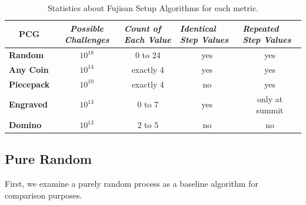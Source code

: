 \documentclass[10pt,journal,compsoc]{IEEEtran}
\begin{document}
\begin{table}[]
\centering
\renewcommand{\arraystretch}{1.3}
\caption{Statistics about Fujisan Setup Algorithms for each metric.}
\label{table_stats}
\begin{tabular}{l|c|c|c|c|}
\multicolumn{1}{c|}{\textbf{PCG}} & \multicolumn{1}{c|}{\textit{\textbf{Possible Challenges}}} & \multicolumn{1}{l|}{\textit{\textbf{Count of Each Value}}} & \multicolumn{1}{l|}{\textit{\textbf{Identical Step Values}}} & \multicolumn{1}{l|}{\textit{\textbf{Repeated Step Values}}} \\ \hline
\textbf{Random}                   & $10^{18}$                                  & 0 to 24                                                    & yes                                                      & yes                                                            \\ \hline
\textbf{Any Coin}                 & $10^{14}$ & exactly 4                                                  & yes                                                      & yes                                                            \\ \hline
\textbf{Piecepack}                & $10^{10}$                                             & exactly 4                                                  & no                                                       & yes                                                            \\ \hline
\textbf{Engraved}                 & $10^{13}$                                                 & 0 to 7                                                     & yes                                                      & only at summit                                                 \\ \hline
\textbf{Domino}                   & $10^{13} $                                                   & 2 to 5                                                     & no                                                       & no                                                             \\ \hline
\end{tabular}
\end{table}

\subsection{Pure Random}

First, we examine a purely random process as a baseline algorithm for comparison purposes.
\end{document}
